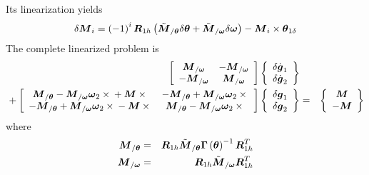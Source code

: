 \documentclass[10pt,dvips,fleqn]{report}
\newcommand{\T}[1]{\boldsymbol{#1}}
\begin{document}
Its linearization yields
\begin{equation}
	\delta\T{M}_i = \plbr{-1}^i \T{R}_{1h} \plbr{
		\tilde{\T{M}}_{/\T{\theta}} \delta \T{\theta}
		+ \tilde{\T{M}}_{/\T{\omega}} \delta\T{\omega}
	} - \T{M}_i \times \T{\theta}_{1\delta}
\end{equation}
The complete linearized problem is
\begin{eqnarray*}
	\sqbr{\matr{cc}{
		\T{M}_{/\T{\omega}} & - \T{M}_{/\T{\omega}} \\
		- \T{M}_{/\T{\omega}} & \T{M}_{/\T{\omega}}
	}}\cubr{\cvvect{
		\delta\dot{\T{g}}_1 \\
		\delta\dot{\T{g}}_2
	}} & & \\
	\mbox{} + \sqbr{\matr{cc}{
		\T{M}_{/\T{\theta}} - \T{M}_{/\T{\omega}} \T{\omega}_2\times{} + \T{M}\times{} & 
			- \T{M}_{/\T{\theta}} + \T{M}_{/\T{\omega}} \T{\omega}_2\times{} \\
		- \T{M}_{/\T{\theta}} + \T{M}_{/\T{\omega}} \T{\omega}_2\times{} - \T{M}\times{} & 
			\T{M}_{/\T{\theta}} - \T{M}_{/\T{\omega}} \T{\omega}_2\times{}
	}}\cubr{\cvvect{
		\delta\T{g}_1 \\
		\delta\T{g}_2
	}} & = & \cubr{\cvvect{
		\T{M} \\
		- \T{M}
	}}
\end{eqnarray*}
where
\begin{eqnarray*}
	\T{M}_{/\T{\theta}} & = & \T{R}_{1h} \tilde{\T{M}}_{/\T{\theta}} \T{\Gamma}\plbr{\T{\theta}}^{-1} \T{R}_{1h}^T \\
	\T{M}_{/\T{\omega}} & = & \T{R}_{1h} \tilde{\T{M}}_{/\T{\omega}} \T{R}_{1h}^T
\end{eqnarray*}
\end{document}
